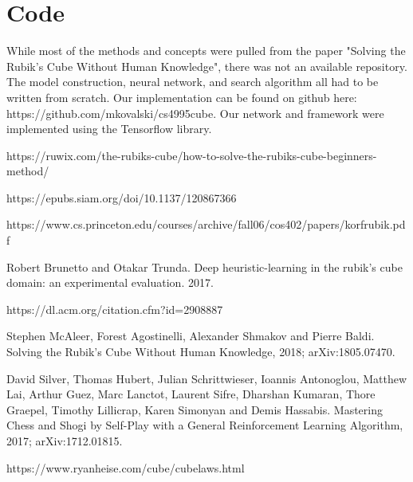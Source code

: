 \documentclass[10pt,twocolumn,letterpaper]{article}
\begin{document}



\section{Code}

While most of the methods and concepts were pulled from the paper "Solving the Rubik’s Cube Without Human Knowledge", there was not an available repository.  The model construction, neural network, and search algorithm all had to be written from scratch.  Our implementation can be found on github here: https://github.com/mkovalski/cs4995\textunderscore cube.  Our network and framework were implemented using the Tensorflow library. 




\begin{thebibliography}{9}

\bibitem{}
https://ruwix.com/the-rubiks-cube/how-to-solve-the-rubiks-cube-beginners-method/

\bibitem{}
https://epubs.siam.org/doi/10.1137/120867366

\bibitem{}
https://www.cs.princeton.edu/courses/archive/fall06/cos402/papers/korfrubik.pdf

\bibitem{}
Robert Brunetto and Otakar Trunda. Deep heuristic-learning in the rubik’s cube domain: an experimental evaluation. 2017.

\bibitem{}
https://dl.acm.org/citation.cfm?id=2908887

Stephen McAleer, Forest Agostinelli, Alexander Shmakov and Pierre Baldi.
\newblock Solving the Rubik's Cube Without Human Knowledge, 2018;
\newblock arXiv:1805.07470.

David Silver, Thomas Hubert, Julian Schrittwieser, Ioannis Antonoglou, Matthew Lai, Arthur Guez, Marc Lanctot, Laurent Sifre, Dharshan Kumaran, Thore Graepel, Timothy Lillicrap, Karen Simonyan and Demis Hassabis.
\newblock Mastering Chess and Shogi by Self-Play with a General Reinforcement Learning Algorithm, 2017;
\newblock arXiv:1712.01815.

\bibitem{}
https://www.ryanheise.com/cube/cube\textunderscore laws.html


\end{thebibliography}

{\small


}
\end{document}
